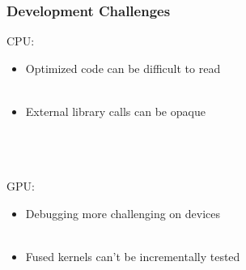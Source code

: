 \documentclass{beamer}
\begin{document}
\begin{frame}
\begin{center}
\frametitle{Development Challenges}

CPU:\\

\begin{itemize}

\item Optimized code can be difficult to read\\

~\\

\item External library calls can be opaque\\

\end{itemize}\\

~\\

~\\

GPU:\\

\begin{itemize}

\item Debugging more challenging on devices\\

~\\

\item Fused kernels can't be incrementally tested\\

\end{itemize}

\end{center}
\end{frame}

\end{document}
